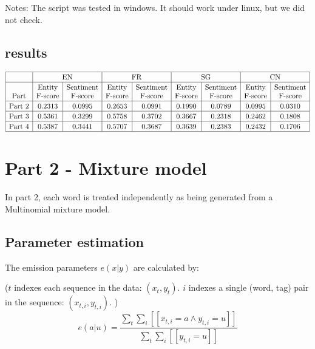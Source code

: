 \documentclass[12pt]{article}
\begin{document}
Notes: The script was tested in windows. It should work under linux, but we did not check.

\subsection{results}
\[
\begin{array}{|c|c|c|c|c|c|c|c|c|}
\hline \rule{0pt}{1em}
& \multicolumn{2}{c|}{\mbox{EN}}
& \multicolumn{2}{c|}{\mbox{FR}}
& \multicolumn{2}{c|}{\mbox{SG}}
& \multicolumn{2}{c|}{\mbox{CN}} \\
\hline \rule{0pt}{1em}
            & \mbox{Entity} & \mbox{Sentiment} 
            & \mbox{Entity} & \mbox{Sentiment}
            & \mbox{Entity} & \mbox{Sentiment}
            & \mbox{Entity} & \mbox{Sentiment} \\
\mbox{Part} & \mbox{F-score} & \mbox{F-score} 
            & \mbox{F-score} & \mbox{F-score}
            & \mbox{F-score} & \mbox{F-score}
            & \mbox{F-score} & \mbox{F-score} \\
\hline \rule{0pt}{1em}
\mbox{Part 2} & 0.2313 & 0.0995 & 0.2653 & 0.0991 & 0.1990 & 0.0789 & 0.0995 & 0.0310 \\
\hline \rule{0pt}{1em}
\mbox{Part 3} & 0.5361 & 0.3299 & 0.5758 & 0.3702 & 0.3667 & 0.2318 & 0.2462 & 0.1808 \\
\hline \rule{0pt}{1em}
\mbox{Part 4} & 0.5387 & 0.3441 & 0.5707 & 0.3687 & 0.3639 & 0.2383 & 0.2432 & 0.1706 \\
\hline
\end{array}
\]



\pagebreak

\section{Part 2 - Mixture model}

In part 2, each word is treated independently as being generated from a Multinomial mixture model.

\subsection{Parameter estimation}

The emission parameters \(e(x|y)\) are calculated by:

(\(t\) indexes each sequence in the data: \((x_t, y_t)\). \(i\) indexes a single (word, tag) pair in the sequence: \((x_{t,i}, y_{t,i})\). )
\[ e(a|u) = \frac{\sum_t \sum_i [[x_{t,i}=a \land y_{t,i}=u]] }{\sum_{t} \sum_i [[y_{t,i}=u]] } \]
\end{document}
